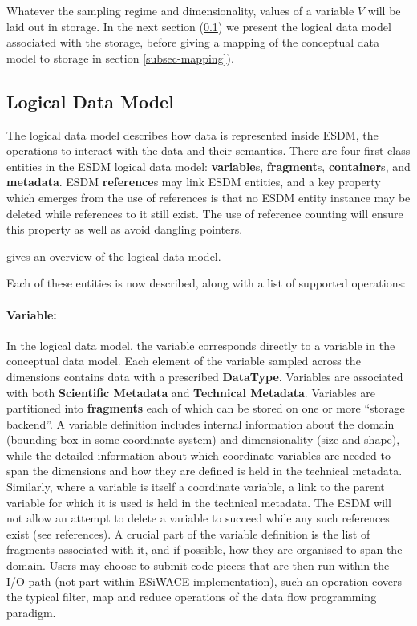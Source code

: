 Whatever the sampling regime and dimensionality, values of a variable $V$ will be laid out in storage. In the next section (\ref{subsec-ldm}) we present the logical data model associated with the storage, before giving a mapping of the conceptual data model to storage in section \ref{subsec-mapping}).


\subsection{Logical Data Model}
\label {subsec-ldm}

The logical data model describes how data is represented inside ESDM, the operations to interact with the data and their semantics. There are four first-class entities in the ESDM logical data model: \textbf{variable}s, \textbf{fragment}s, \textbf{container}s, and \textbf{metadata}. ESDM \textbf{reference}s may link ESDM entities, and a key property which emerges from the use of references is that no ESDM entity instance may be deleted while references to it still exist. The use of reference counting will ensure this property as well as avoid dangling pointers.

 gives an overview of the logical data model.



Each of these entities is now described, along with a list of supported operations:

\paragraph{Variable:} In the logical data model, the variable corresponds directly to a variable in the conceptual data model. Each element of the variable sampled across the dimensions contains data with a prescribed \textbf{DataType}.
Variables are associated with both \textbf{Scientific Metadata} and \textbf{Technical Metadata}. Variables are partitioned into \textbf{fragments} each of which can be stored on one or more ``storage backend''.
A variable definition includes internal information about the domain (bounding box in some coordinate system)  and dimensionality (size and shape), while the detailed information about which coordinate variables are needed to span the dimensions and how they are defined is held in the technical metadata.  Similarly, where a variable is itself a coordinate variable, a link to the parent variable for which it is used is held in the technical metadata.
The ESDM will not allow an attempt to delete a variable to succeed while any such references exist (see references).
A crucial part of the variable definition is the list of fragments associated with it, and if possible, how they are organised to span the domain.
Users may choose to submit code pieces that are then run within the I/O-path (not part within ESiWACE implementation), such an operation covers the typical filter, map and reduce operations of the data flow programming paradigm.

